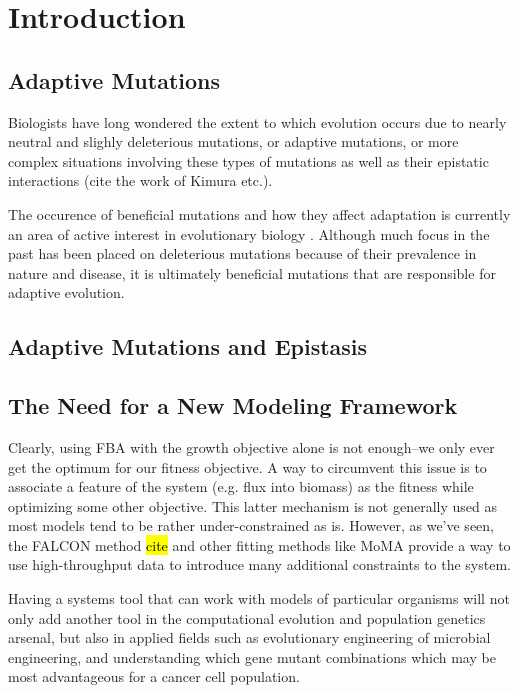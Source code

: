 \section{Introduction}

\subsection{Adaptive Mutations}

Biologists have long wondered the extent to which evolution occurs due
to nearly neutral and slighly deleterious mutations, or adaptive
mutations, or more complex situations involving these types of
mutations as well as their epistatic interactions (cite the work of
Kimura etc.).

The occurence of beneficial mutations and how they affect adaptation
is currently an area of active interest in evolutionary biology
\citep{Chou2011, Weinreich2006}. Although much focus in the past
has been placed on deleterious mutations because of their prevalence
in nature and disease, it is ultimately beneficial mutations that
are responsible for adaptive evolution.
 
\subsection{Adaptive Mutations and Epistasis}



\subsection{The Need for a New Modeling Framework}
Clearly, using FBA with the growth objective alone is not enough--we
only ever get the optimum for our fitness objective.  A way to
circumvent this issue is to associate a feature of the system
(e.g. flux into biomass) as the fitness while optimizing some other
objective. This latter mechanism is not generally used as most models
tend to be rather under-constrained as is. However, as we've seen, the
FALCON method \hl{cite} and other fitting methods like MoMA provide a
way to use high-throughput data to introduce many additional
constraints to the system.

Having a systems tool that can work with models of particular organisms
will not only add another tool in the computational evolution and
population genetics arsenal, but also in applied fields such as
evolutionary engineering of microbial engineering, and understanding
which gene mutant combinations which may be most advantageous for
a cancer cell population.

